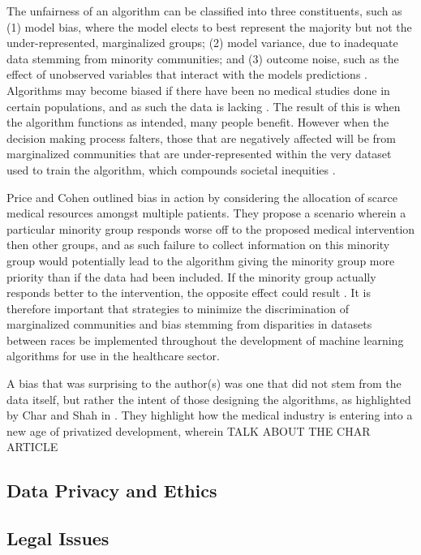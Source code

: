 \documentclass[12pt]{article}
\begin{document}
The unfairness of an algorithm can be classified into three constituents, such as (1) model bias, where the model elects to best represent the majority but not the under-represented, marginalized groups; (2) model variance, due to inadequate data stemming from minority communities; and (3) outcome noise, such as the effect of unobserved variables that interact with the models predictions \citep{Chen_2018}. 
Algorithms may become biased if there have been no medical studies done in certain populations, and as such the data is lacking \citep{Char_2018}. The result of this is when the algorithm functions as intended, many people benefit. However when the decision making process falters, those that are negatively affected will be from marginalized communities that are under-represented within the very dataset used to train the algorithm, which compounds societal inequities \citep{Panch_2018}.


Price and Cohen outlined bias in action by considering the allocation of scarce medical resources amongst multiple patients. They propose a scenario wherein a particular minority group responds worse off to the proposed medical intervention then other groups, and as such failure to collect information on this minority group would potentially lead to the algorithm giving the minority group more priority than if the data had been included. If the minority group actually responds better to the intervention, the opposite effect could result \citep{Price_2019}.
It is therefore important that strategies to minimize the discrimination of marginalized communities and bias stemming from disparities in datasets between races be implemented throughout the development of machine learning algorithms for use in the healthcare sector.


A bias that was surprising to the author(s) was one that did not stem from the data itself, but rather the intent of those designing the algorithms, as highlighted by Char and Shah in \citep{Char_2018}. They highlight how the medical industry is entering into a new age of privatized development, wherein TALK ABOUT THE CHAR ARTICLE

\subsection{Data Privacy and Ethics}

\subsection{Legal Issues}

\newpage


\end{document}
